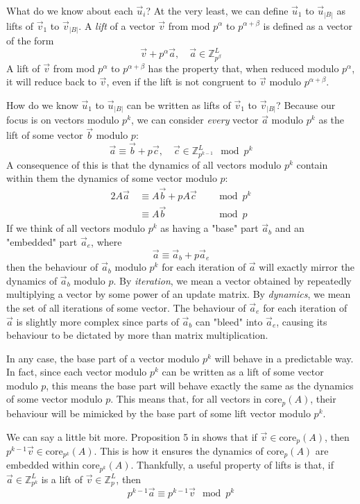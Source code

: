 \documentclass[a4paper, reqno, 12pt]{amsart}
\newcommand\core[2]{\text{core}_{#1}(#2)}
\begin{document}
	What do we know about each $\vec{u}_{i}$? At the very least, we can define $\vec{u}_{1}$ to $\vec{u}_{|B|}$ as lifts of $\vec{v}_{1}$ to $\vec{v}_{|B|}$. A 
	\emph{lift} of a vector $\vec{v}$ from mod $p^\alpha$ to $p^{\alpha + \beta}$ is defined as a vector of the form
	\[
		\vec{v} + p^{\alpha}\vec{a}, \quad \vec{a} \in \mathds{Z}_{p^\beta}^{L}
	\]
	A lift of $\vec{v}$ from mod $p^\alpha$ to $p^{\alpha+\beta}$ has the property that, when reduced modulo $p^\alpha$, it will reduce back to $\vec{v}$, even if the
	lift is not congruent to $\vec{v}$ modulo $p^{\alpha+\beta}$.
	
	How do we know $\vec{u}_1$ to $\vec{u}_{|B|}$ can be written as lifts of $\vec{v}_1$ to $\vec{v}_{|B|}$? Because our focus is on vectors modulo $p^k$, we can 
	consider \emph{every} vector $\vec{a}$ modulo $p^k$ as the lift of some vector $\vec{b}$ modulo $p$:
	\[
		\vec{a} \equiv \vec{b} + p\vec{c}, \quad \vec{c} \in \mathds{Z}_{p^{k-1}}^L \mod{p^k}
	\]
	A consequence of this is that the dynamics of all vectors modulo $p^k$ contain within them the dynamics of some vector modulo $p$:
	\begin{alignat*}{2}
		A\vec{a} \, &\equiv A\vec{b} + pA\vec{c} && \mod{p^k} \\
		         \, &\equiv A\vec{b} && \mod{p}
	\end{alignat*}
	If we think of all vectors modulo $p^k$ as having a "base" part $\vec{a}_b$ and an "embedded" part $\vec{a}_e$, where
	\[
		\vec{a} \equiv \vec{a}_b + p\vec{a}_e
	\]
	then the behaviour of $\vec{a}_b$ modulo $p^k$ for each iteration of $\vec{a}$ will exactly mirror the dynamics of $\vec{a}_b$ modulo $p$. By \emph{iteration}, 
	we mean a vector obtained by repeatedly multiplying a vector by some power of an update matrix. By \emph{dynamics}, we mean the set of all iterations of some 
	vector. The behaviour of $\vec{a}_e$ for each iteration of $\vec{a}$ is slightly more complex since parts of $\vec{a}_b$ can "bleed" into $\vec{a}_e$, causing 
	its behaviour to be dictated by more than matrix multiplication.
	
	In any case, the base part of a vector modulo $p^k$ will behave in a predictable way. In fact, since each vector modulo $p^k$ can be written as a lift of some 
	vector modulo $p$, this means the base part will behave exactly the same as the dynamics of some vector modulo $p$. This means that, for all vectors in
	$\core{p}{A}$, their behaviour will be mimicked by the base part of some lift vector modulo $p^k$.
	
	We can say a little bit more. Proposition 5 in \citet{Mendivil2012} shows that if $\vec{v} \in \core{p}{A}$, then $p^{k-1}\vec{v} \in \core{p^k}{A}$. This is
	how it ensures the dynamics of $\core{p}{A}$ are embedded within $\core{p^k}{A}$. Thankfully, a useful property of lifts is that, if 
	$\vec{a} \in \mathds{Z}_{p^k}^L$ is a lift of $\vec{v} \in \mathds{Z}_{p}^L$, then
	\[
		p^{k-1}\vec{a} \equiv p^{k-1}\vec{v} \mod{p^k}
	\]
	
\end{document}
